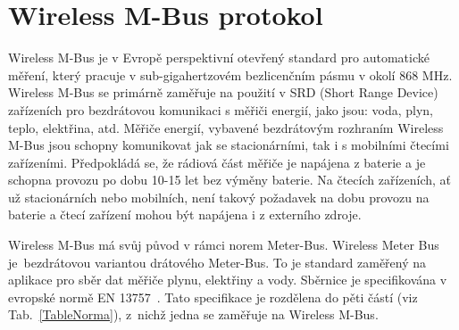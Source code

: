 \chapter{Wireless M-Bus protokol}
\label{ChapterWMBus}
Wireless M-Bus je v Evropě perspektivní otevřený standard pro automatické měření, který pracuje v sub-gigahertzovém bezlicenčním pásmu v okolí 868 MHz. Wireless M-Bus se primárně zaměřuje na použití v SRD (Short Range Device) zařízeních pro bezdrátovou komunikaci s měřiči energií, jako jsou: voda, plyn, teplo, elektřina, atd. Měřiče energií, vybavené bezdrátovým rozhraním Wireless M-Bus jsou schopny komunikovat jak se stacionárními, tak i s mobilními čtecími zařízeními. Předpokládá se, že rádiová část měřiče je napájena z baterie a je schopna provozu po dobu 10-15 let bez výměny baterie. Na čtecích zařízeních, ať už stacionárních nebo mobilních, není takový požadavek na dobu provozu na baterie a čtecí zařízení mohou být napájena i z externího zdroje.

Wireless M-Bus má svůj původ v rámci norem Meter-Bus. Wireless Meter Bus je~bezdrátovou variantou drátového Meter-Bus. To je standard zaměřený na aplikace pro sběr dat měřiče plynu, elektřiny a vody. Sběrnice je specifikována v evropské normě EN 13757~\cite{Norma1}. Tato specifikace je rozdělena do pěti částí (viz Tab.~\ref{TableNorma}), z~nichž jedna se zaměřuje na Wireless M-Bus.

